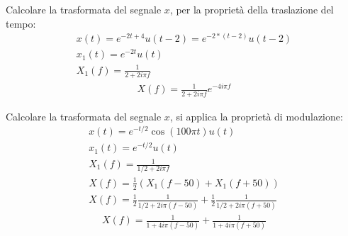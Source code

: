 \documentclass{article}
\begin{document}
Calcolare la trasformata del segnale $x$, per la proprietà della traslazione del tempo:
\begin{gather*}
    x(t)=e^{-2t+4}u(t-2)=e^{-2*(t-2)}u(t-2)\\
    x_1(t)=e^{-2t}u(t)\\
    X_1(f)=\displaystyle\frac{1}{2+2i\pi f}
\end{gather*}
\begin{gather}
    X(f)=\displaystyle\frac{1}{2+2i\pi f}e^{-4i\pi f}
\end{gather}

Calcolare la trasformata del segnale $x$, si applica la proprietà di modulazione: 
\begin{gather*}
    x(t)=e^{-t/2}\cos(100\pi t)u(t)\\
    x_1(t)=e^{-t/2}u(t)\\
    X_1(f)=\displaystyle\frac{1}{1/2+2i\pi f}\\
    X(f)=\displaystyle\frac{1}{2}\left(X_1(f-50)+X_1(f+50)\right)\\
    X(f)=\displaystyle\frac{1}{2}\frac{1}{1/2+2i\pi (f-50)}+\frac{1}{2}\frac{1}{1/2+2i\pi (f+50)}
\end{gather*}
\begin{gather}
    X(f)=\displaystyle\frac{1}{1+4i\pi (f-50)}+\frac{1}{1+4i\pi (f+50)}
\end{gather}
\end{document}
